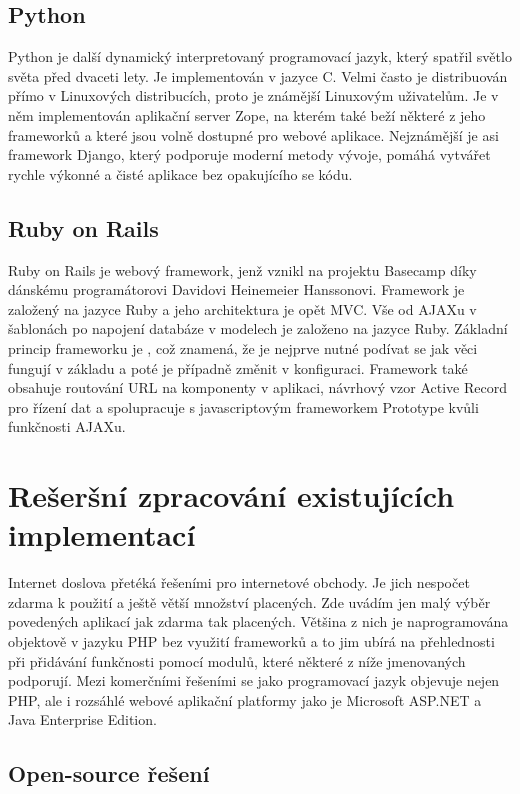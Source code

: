 \documentclass[11pt,twoside,a4paper]{book}
\begin{document}
\subsection{Python}
Python je další dynamický interpretovaný programovací jazyk, který spatřil světlo světa před dvaceti lety. Je implementován v jazyce C. Velmi často je distribuován přímo v Linuxových distribucích, proto je známější Linuxovým uživatelům. Je v něm implementován aplikační server Zope, na kterém také beží některé z jeho frameworků a které jsou volně dostupné pro webové aplikace. Nejznámější je asi framework Django, který podporuje moderní metody vývoje, pomáhá vytvářet rychle výkonné a čisté aplikace bez opakujícího se kódu\cite{wiki:python}.

\subsection{Ruby on Rails}
Ruby on Rails je webový framework, jenž vznikl na projektu Basecamp díky dánskému programátorovi Davidovi Heinemeier Hanssonovi. Framework je založený na jazyce Ruby a jeho architektura je opět MVC. Vše od AJAXu v šablonách po napojení databáze v modelech je založeno na jazyce Ruby. Základní princip frameworku je , což znamená, že je nejprve nutné podívat se jak věci fungují v základu a poté je případně změnit v konfiguraci. Framework také obsahuje routování URL na komponenty v aplikaci, návrhový vzor Active Record pro řízení dat a spolupracuje s javascriptovým frameworkem Prototype kvůli funkčnosti AJAXu\cite{wiki:ror}. 

\section{Rešeršní zpracování existujících implementací}

Internet doslova přetéká řešeními pro internetové obchody. Je jich nespočet zdarma k použití a ještě větší množství placených. Zde uvádím jen malý výběr povedených aplikací jak zdarma tak placených. Většina z nich je naprogramována objektově v jazyku PHP bez využití frameworků a to jim ubírá na přehlednosti při přidávání funkčnosti pomocí modulů, které některé z níže jmenovaných podporují. Mezi komerčními řešeními se jako programovací jazyk objevuje nejen PHP, ale i rozsáhlé webové aplikační platformy jako je Microsoft ASP.NET a Java Enterprise Edition.

\subsection{Open-source řešení}
\end{document}
